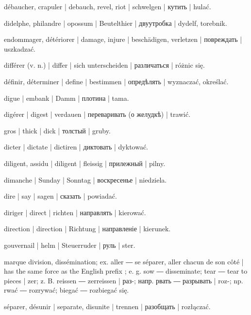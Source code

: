 \begin{outdent}{1em}
débaucher, crapuler | debauch, revel, riot | schwelgen | кутить | hulać.

didelphe, philandre | opossum | Beutelthier | двуутробка | dydelf, torebnik.

endommager, détériorer | damage, injure | beschädigen,
verletzen | повреждать | uszkadzać.

différer (v. n.) | differ | sich unterscheiden | различаться | różnic się.

définir, déterminer | define | bestimmen | опредѣлять | wyznaczać, określać.

digue | embank | Damm | плотина | tama.

digérer | digest | verdauen | переваривать (о желудкѣ) | trawić.

gros | thick | dick | толстый | gruby.

dicter | dictate | dictiren | диктовать | dyktować.

diligent, assidu | diligent | fleissig | прилежный | pilny.

dimanche | Sunday | Sonntag | воскресенье | niedziela.

dire | say | sagen | сказать | powiadać.

diriger | direct | richten | направлять | kierować.

\uvsubentry{}
direction | direction | Richtung | направленіе | kierunek.


\uvsubentry{}
gouvernail | helm | Steuerruder | руль | ster.

marque division, dissémination; ex.  aller ― 
se séparer, aller chacun de son côté | has the same force as the
English prefix ; e. g.  sow ―
 disseminate;  tear ―  tear to pieces | zer; z. B.  reissen ―  zerreissen | раз-;
напр.  рвать ―  разрывать | roz-; np.  rwać ―
 rozrywać;  biegać ―  rozbiegać się.

\uvsubentry{}
séparer, désunir | separate, disunite | trennen | разобщать | rozłączać.


\end{outdent}
